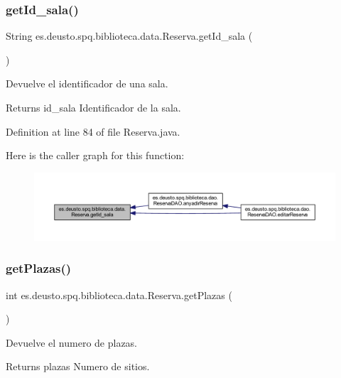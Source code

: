 \subsubsection{\texorpdfstring{get\+Id\+\_\+sala()}{getId\_sala()}}
{\footnotesize\ttfamily String es.\+deusto.\+spq.\+biblioteca.\+data.\+Reserva.\+get\+Id\+\_\+sala (\begin{DoxyParamCaption}{ }\end{DoxyParamCaption})}

Devuelve el identificador de una sala. \begin{DoxyReturn}{Returns}
id\+\_\+sala Identificador de la sala. 
\end{DoxyReturn}


Definition at line 84 of file Reserva.\+java.

Here is the caller graph for this function\+:
\nopagebreak
\begin{figure}[H]
\begin{center}
\leavevmode
\includegraphics[width=350pt]{classes_1_1deusto_1_1spq_1_1biblioteca_1_1data_1_1_reserva_a011ade5ee624395a738a300551f0413e_icgraph}
\end{center}
\end{figure}
\mbox{\label{classes_1_1deusto_1_1spq_1_1biblioteca_1_1data_1_1_reserva_a106193dad77251c988277714d9e83af6}} 
\subsubsection{\texorpdfstring{get\+Plazas()}{getPlazas()}}
{\footnotesize\ttfamily int es.\+deusto.\+spq.\+biblioteca.\+data.\+Reserva.\+get\+Plazas (\begin{DoxyParamCaption}{ }\end{DoxyParamCaption})}

Devuelve el numero de plazas. \begin{DoxyReturn}{Returns}
plazas Numero de sitios. 
\end{DoxyReturn}


